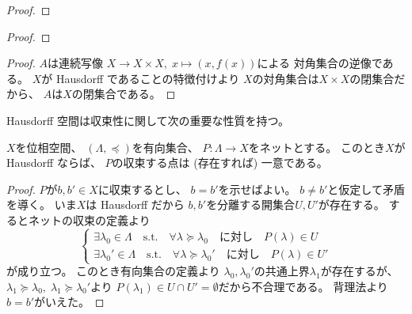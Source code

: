 \documentclass[report]{jlreq}
\begin{document}
\begin{proof}
    \TODO{}
\end{proof}

\begin{theorem}
    \TODO{}
\end{theorem}

\begin{proof}
    \TODO{}
\end{proof}


\begin{proof}
    $A$は連続写像
    $X \to X \times X, \; x \mapsto (x, f(x))$による
    対角集合の逆像である。
    $X$が Hausdorff であることの特徴付けより
    $X$の対角集合は$X \times X$の閉集合だから、
    $A$は$X$の閉集合である。
\end{proof}

Hausdorff 空間は収束性に関して次の重要な性質を持つ。

\begin{proposition}[極限の一意性]
    $X$を位相空間、
    $(\Lambda, \preceq)$を有向集合、
    $P \colon \Lambda \to X$をネットとする。
    このとき$X$が Hausdorff ならば、
    $P$の収束する点は (存在すれば) 一意である。
\end{proposition}

\begin{proof}
    $P$が$b, b' \in X$に収束するとし、
    $b = b'$を示せばよい。
    $b \neq b'$と仮定して矛盾を導く。
    いま$X$は Hausdorff だから
    $b, b'$を分離する開集合$U, U'$が存在する。
    するとネットの収束の定義より
    \begin{equation}
        \begin{cases}
            \exists \lambda_0 \in \Lambda
                \quad \text{s.t.} \quad
                \forall \lambda \succeq \lambda_0
                \quad \text{に対し} \quad
                P(\lambda) \in U \\
            \exists \lambda_0' \in \Lambda
                \quad \text{s.t.} \quad
                \forall \lambda \succeq \lambda_0'
                \quad \text{に対し} \quad
                P(\lambda) \in U'
        \end{cases}
    \end{equation}
    が成り立つ。
    このとき有向集合の定義より
    $\lambda_0, \lambda_0'$の共通上界$\lambda_1$が存在するが、
    $\lambda_1 \succeq \lambda_0, \; \lambda_1 \succeq \lambda_0'$より
    $P(\lambda_1) \in U \cap U' = \emptyset$だから不合理である。
    背理法より$b = b'$がいえた。
\end{proof}
\end{document}
